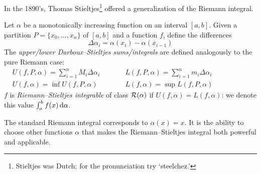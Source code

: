 \begin{exercises}
\begin{enumerate}

\end{enumerate}
\end{exercises}

\clearpage


In the 1890's, Thomas Stieltjes\footnote{Stieltjes was Dutch; for the pronunciation try `steelchez.'} offered a generalization of the Riemann integral.

\begin{defn}{}{}
Let $\alpha$ be a monotonically increasing function on an interval $[a,b]$. Given a partition $P=\{x_0,\ldots,x_n\}$ of $[a,b]$ and a function $f$, define the differences
\[\Delta\alpha_i=\alpha(x_i)-\alpha(x_{i-1})\]
The \emph{upper/lower Darboux--Stieltjes sums/integrals} are defined analogously to the pure Riemann case:\vspace{-5pt}
\begin{align*}
&U(f,P,\alpha)=\sum_{i=1}^n M_i\Delta\alpha_i\qquad &&L(f,P,\alpha)=\sum_{i=1}^n m_i\Delta\alpha_i &&\phantom{bobobobobobobobo}\\
&U(f,\alpha)=\inf U(f,P,\alpha)\qquad &&L(f,\alpha)=\sup L(f,P,\alpha)&&
\end{align*}
$f$ is \emph{Riemann--Stieltjes integrable} of class $\mathcal{R}(\alpha)$ if $U(f,\alpha)=L(f,\alpha)$: we denote this value $\int_a^b f(x)\,\mathrm{d}\alpha$. 
\end{defn}

The standard Riemann integral corresponds to $\alpha(x)=x$. It is the ability to choose other functions $\alpha$ that makes the Riemann--Stieltjes integral both powerful and applicable. %

